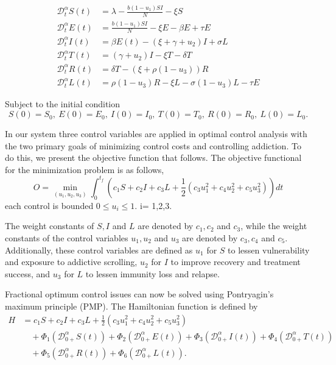 \documentclass[10pt]{article}
\newcommand{\CD}{\mathcal{D}}
\begin{document}
	\begin{align}
		\CD_{t}^{\alpha} S(t) &= \lambda - \frac{b (1 - u_{1}) SI}{N} - \xi S \\
		\CD_{t}^{\alpha} E(t) &= \frac{b (1 - u_{1})SI}{N} - \xi E - \beta E + \tau E \\
		\CD_{t}^{\alpha} I(t) &= \beta E(t) - (\xi + \gamma + u_{2})I + \sigma L \\
		\CD_{t}^{\alpha} T(t) &= (\gamma + u_{2})I - \xi T - \delta T \\
		\CD_{t}^{\alpha} R(t) &= \delta T - (\xi + \rho(1 - u_{3}))R \\
		\CD_{t}^{\alpha} L(t) &= \rho(1 - u_{3})R - \xi L - \sigma(1 - u_{3})L - \tau E
		\label{eq:control_system}
	\end{align}
	
	Subject to the initial condition
	\begin{equation}
		S(0) = S_{0},\ E(0) = E_{0},\ I(0) = I_{0},\ T(0) = T_{0},\ R(0) = R_{0},\ L(0) = L_{0}.
		\label{eq:initial_control}
	\end{equation}
	
	In our system three control variables are applied in optimal control analysis with the two primary goals of minimizing control costs and controlling addiction. To do this, we present the objective function that follows. The objective functional for the minimization problem is as follows,
	\begin{equation}
		O = \min_{(u_{1},u_{2},u_{3})} \int_{0}^{t_{f}} \left( c_{1}S + c_{2}I + c_{3}L + \frac{1}{2}\left( c_{3}u_{1}^{2} + c_{4}u_{2}^{2} + c_{5}u_{3}^{2} \right) \right) dt
		\label{eq:objective}
	\end{equation}
	each control is bounded $0 \leq u_{i} \leq 1$. i= 1,2,3.
	
	The weight constants of $S, I$ and $L$ are denoted by $c_{1}, c_{2}$ and $c_{3}$, while the weight constants of the control variables $u_{1}, u_{2}$ and $u_{3}$ are denoted by $c_{3}, c_{4}$ and $c_{5}$. Additionally, these control variables are defined as $u_{1}$ for $S$ to lessen vulnerability and exposure to addictive scrolling, $u_{2}$ for $I$ to improve recovery and treatment success, and $u_{3}$ for $L$ to lessen immunity loss and relapse.
	
	Fractional optimum control issues can now be solved using Pontryagin's maximum principle (PMP). The Hamiltonian function is defined by
	\begin{align}
		H &= c_{1} S + c_{2} I + c_{3}L + \frac{1}{2}\left( c_{3}u_{1}^{2} + c_{4}u_{2}^{2} + c_{5}u_{3}^{2} \right) \nonumber \\
		&\quad + \Phi_{1}\left( \CD_{0+}^{\alpha}S(t) \right) + \Phi_{2}\left( \CD_{0+}^{\alpha}E(t) \right) + \Phi_{3}\left( \CD_{0+}^{\alpha}I(t) \right) + \Phi_{4}\left( \CD_{0+}^{\alpha}T(t) \right) \nonumber \\
		&\quad + \Phi_{5}\left( \CD_{0+}^{\alpha}R(t) \right) + \Phi_{6}\left( \CD_{0+}^{\alpha}L(t) \right).
		\label{eq:hamiltonian}
	\end{align}
	
\end{document}
